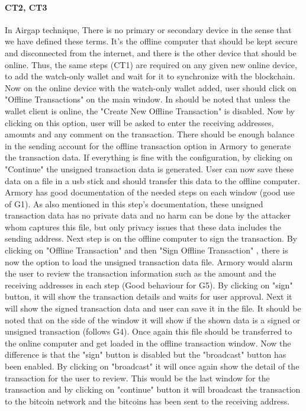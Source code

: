\paragraph{CT2, CT3} 
In Airgap technique, There is no primary or secondary device in the sense that we have defined these terms. It's the offline computer that should be kept secure and disconnected from the internet, and there is the other device that should be online. Thus, the same steps (CT1) are required on any given new online device, to add the watch-only wallet and wait for it to synchronize with the blockchain.\\
Now on the online device with the watch-only wallet added, user should click on "Offline Transactions" on the main window. In should be noted that unless the wallet client is online, the "Create New Offline Transaction" is disabled. Now by clicking on this option, user will be asked to enter the receiving addresses, amounts and any comment on the transaction. There should be enough balance in the sending account for the offline transaction option in Armory to generate the transaction data. If everything is fine with the configuration, by clicking on "Continue" the unsigned transaction data is generated. User can now save these data on a file in a usb stick and should transfer this data to the offline computer. Armory has good documentation of the needed steps on each window (good use of G1). As also mentioned in this step's documentation, these unsigned transaction data has no private data and no harm can be done by the attacker whom captures this file, but only privacy issues that these data includes the sending address.
Next step is on the offline computer to sign the transaction. By clicking on "Offline Transaction" and then "Sign Offline Transaction" , there is now the option to load the unsigned transaction data file. Armory would alarm the user to review the transaction information such as the amount and the receiving addresses in each step (Good behaviour for G5). By clicking on "sign" button, it will show the transaction details and waits for user approval.  Next it will show the signed transaction data and user can save it in the file. It should be noted that on the side of the window it will show if the shown data is a signed or unsigned transaction (follows G4). 
Once again this file should be transferred to the online computer and get loaded in the offline transaction window. Now the difference is that the "sign" button is disabled but the "broadcast" button has been enabled. By clicking on "broadcast" it will once again show the detail of the transaction for the user to review. This would be the last window for the transaction and by clicking on "continue" button it will broadcast the transaction to the bitcoin network and the bitcoins has been sent to the receiving address.

